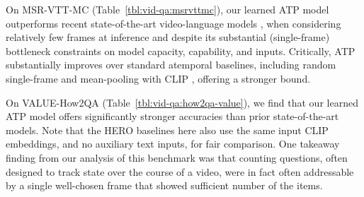 On MSR-VTT-MC (Table~\ref{tbl:vid-qa:msrvttmc}), our learned ATP model outperforms recent state-of-the-art video-language models \cite{xu2021videoclip,zellersluhessel2021merlot,lei2021less}, when considering relatively few frames at inference and despite its substantial (single-frame) bottleneck constraints on model capacity, capability, and inputs. Critically, ATP substantially improves over standard atemporal baselines, including random single-frame and mean-pooling with CLIP \cite{radford2021learning}, offering a stronger bound.

On VALUE-How2QA (Table~\ref{tbl:vid-qa:how2qa-value}), we find that our learned ATP model offers significantly stronger accuracies than prior state-of-the-art models. Note that the HERO baselines here also use the same input CLIP embeddings, and no auxiliary text inputs, for fair comparison. One takeaway finding from our analysis of this benchmark was that counting questions, often designed to track state over the course of a video, were in fact often addressable by a single well-chosen frame that showed sufficient number of the items.

\begin{table}[bt]
\centering
{}
\caption{\textbf{VideoQA on NExT-QA.} We report accuracies on the overall main dataset and descriptive (D), temporal (T), and causal (C) splits. See Section~\ref{sec:exp:next-qa} for details on the ``Temp[ATP]'' and ``Temp[ATP] + ATP'' models, and details on our ATP$_{hard}$ subset.}
\vspace{-.5em}
\label{tbl:vid-qa:next-qa}
\end{table}


